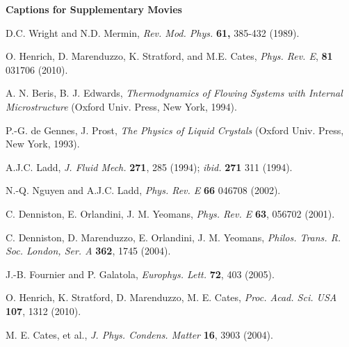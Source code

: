 \documentclass[12pt,twoside]{article}
\begin{document}
\newpage

{\bf Captions for Supplementary Movies} \\


\begin{thebibliography}{99}

D.C. Wright and N.D. Mermin,
{\it Rev. Mod. Phys.} {\bf 61,} 385-432 (1989).




O. Henrich, D. Marenduzzo, K. Stratford, and M.E. Cates,
\textit{Phys. Rev. E}, \textbf{81} 031706 (2010).

A. N. Beris, B. J. Edwards, 
{\it Thermodynamics of Flowing Systems with Internal Microstructure}
(Oxford Univ. Press, New York, 1994).

P.-G. de Gennes, J. Prost,
{\it The Physics of Liquid Crystals} (Oxford Univ. Press, New York, 1993).

A.J.C. Ladd,
\textit{J. Fluid Mech.} \textbf{271}, 285 (1994); \textit{ibid.} \textbf{271}
311 (1994).

N.-Q. Nguyen and A.J.C. Ladd,
\textit{Phys. Rev. E} \textbf{66} 046708 (2002).

C. Denniston, E. Orlandini, J. M. Yeomans, 
\textit{Phys. Rev. E} \textbf{63}, 056702 (2001).

C. Denniston, D. Marenduzzo, E. Orlandini, J. M.  Yeomans, 
\textit{Philos. Trans. R. Soc. London, Ser. A} \textbf{362}, 1745 (2004).

J.-B. Fournier and P. Galatola,
\textit{Europhys. Lett.} \textbf{72}, 403 (2005).

O. Henrich, K. Stratford, D. Marenduzzo, M. E. Cates, 
\textit{Proc. Acad. Sci. USA} \textbf{107}, 1312 (2010).

 M. E. Cates,  et al., 
\textit{J. Phys. Condens. Matter} \textbf{16},  3903 (2004). 


\end{thebibliography}
\end{document}
